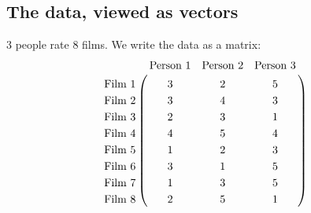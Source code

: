 
\newpage
\subsection*{The data, viewed as vectors}

3 people rate 8 films. We write the data as a matrix:
\begin{align*}
\bordermatrix{
                &\text{Person 1} & \text{Person 2} &\text{Person 3} \cr
  \text{Film 1} &3               &  2              &  5             \cr
  \text{Film 2} &3               &  4              &  3             \cr
  \text{Film 3} &2               &  3              &  1             \cr
  \text{Film 4} &4               &  5              &  4             \cr
  \text{Film 5} &1               &  2              &  3             \cr
  \text{Film 6} &3               &  1              &  5             \cr
  \text{Film 7} &1               &  3              &  5             \cr
  \text{Film 8} &2               &  5              &  1             \cr
}
\end{align*}

